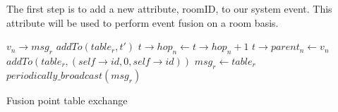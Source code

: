 The first step is to add a new attribute, roomID, to our system event. This attribute will be used to perform event fusion on a room basis.
\begin{algorithm}
\begin{algorithmic}
\REQUIRE \(v_n\rightarrow msg_r\)
			\STATE \(addTo(table_r, t')\)
		\ENDIF
					\STATE \(t\rightarrow hop_n \gets t\rightarrow hop_n+1\)
					\STATE \(t\rightarrow parent_n \gets v_n\)
				\ENDIF
			\ENDIF
		\ENDFOR
	\ENDFOR
		\STATE \(addTo(table_r, (self\rightarrow id, 0, self\rightarrow id))\)
	\ENDIF
	\STATE \(msg_r \gets table_r\)
	\STATE \(periodically\_broadcast(msg_r)\)
\end{algorithmic}
\caption{Fusion point table exchange}
\label{algo:table_r}
\end{algorithm}

